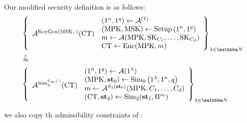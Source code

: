 Our modified security definition is as follows:
\[
\begin{aligned}
	&\left\{
		\begin{array}{l}
		\vcenter{\hbox{$\advers^{\text{KeyGen}(\MSK, \cdot)}(\mathbf{\FECT})$}}
		\end{array}
		\begin{array}{l}
		\left(1^n, 1^q\right) \leftarrow \advers^{(1)} \\
		\left(\MPK, \MSK\right) \leftarrow \text{Setup}\left(1^n, 1^q\right) \\
		m \leftarrow \advers(\MPK, \SK_{C_1}, \dots, \SK_{C_d}) \\
		\FECT \leftarrow \text{Enc}(\MPK, m)
		\end{array}
	\right\}_{\lambda \in \N}\\
&\compInd \\
	&\left\{
		\begin{array}{l}
		\vcenter{\hbox{$\advers^{\Sim_3^{U_m(\cdot)}}(\FECT)$}}
		\end{array}
		\begin{array}{l}
		\left(1^n, 1^q\right) \leftarrow \advers{(1^\lambda)} \\
		\left(\MPK, \mathbf{st}_0\right) \leftarrow \Sim_0\left(1^\lambda, 1^n, q\right) \\
		m \leftarrow \advers^{S_1(\mathbf{st}_0)}(\MPK, C_1, \dots, C_d) \\
		\left(\FECT, \mathbf{st}_2\right) \leftarrow \Sim_2(\mathbf{st}_1, \Pi^m)
		\end{array}
	\right\}_{\lambda \in \N}
\end{aligned}
\]

we also copy th admissibility constraints of \cite{garg2022dynamic}:

